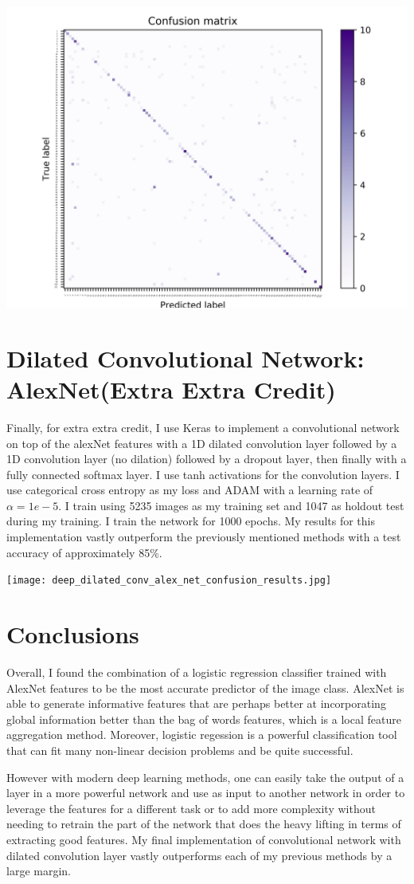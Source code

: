 \documentclass[]{article}
\begin{document}
\includegraphics[scale=0.10]{alex_net_logistic_confusion_results.jpg}


\section{Dilated Convolutional Network: AlexNet(Extra Extra Credit)}
Finally, for extra extra credit, I use Keras to implement a convolutional network on top of the alexNet features with a 1D dilated convolution layer followed by a 1D convolution layer (no dilation) followed by a dropout layer, then finally with a fully connected softmax layer. I use tanh activations for the convolution layers. I use categorical cross entropy as my loss and ADAM with a learning rate of $\alpha = 1e-5$. I train using 5235 images as my training set and 1047 as holdout test during my training. I train the network for 1000 epochs.  My results for this implementation vastly outperform the previously mentioned methods with a test accuracy of approximately 85\%.

\texttt{[image: deep\_dilated\_conv\_alex\_net\_confusion\_results.jpg]}


\section{Conclusions}
Overall, I found the combination of a logistic regression classifier trained with AlexNet features to be the most accurate predictor of the image class. AlexNet is able to generate informative features that are perhaps better at incorporating global information better than the bag of words features, which is a local feature aggregation method. Moreover, logistic regession is a powerful classification tool that can fit many non-linear decision problems and be quite successful. 

However with modern deep learning methods, one can easily take the output of a layer in a more powerful network and use as input to another network in order to leverage the features for a different task or to add more complexity without needing to retrain the part of the network that does the heavy lifting in terms of extracting good features. My final implementation of convolutional network with dilated convolution layer vastly outperforms each of my previous methods by a large margin.
\end{document}
